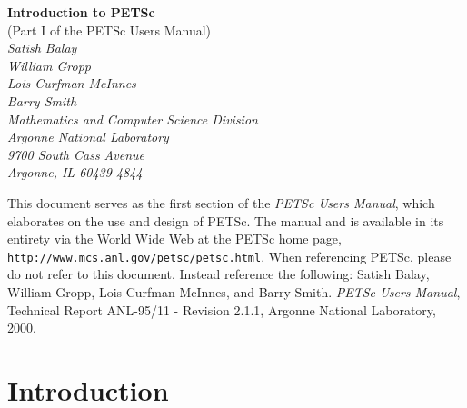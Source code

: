 \documentclass[twoside,12pt]{../sty/report_petsc}
\begin{document}
\begin{center}
$\!$
\vspace{1.0cm}
\thispagestyle{empty}

{\huge \bf Introduction to PETSc}\\ 
\vspace{0.5cm}
{\LARGE (Part I of the PETSc Users Manual)} \\
\vspace{1.5cm}
{\large \em Satish Balay\\William Gropp\\Lois Curfman McInnes\\Barry Smith\\
\medskip \medskip
Mathematics and Computer Science Division\\
Argonne National Laboratory\\
9700 South Cass Avenue\\
Argonne, IL 60439-4844\\
}
\end{center}

\vspace{1.0cm}



 This document serves as the first section of the {\em PETSc Users
Manual}, which elaborates on the use and design of PETSc. The
manual and is available in its entirety via the World Wide Web at
the PETSc home page, {\tt http://www.mcs.anl.gov/petsc/petsc.html}.
When referencing PETSc, please do 
not refer to this document. Instead reference the following: Satish
Balay, William Gropp, Lois Curfman McInnes, and Barry Smith.  {\em
PETSc Users Manual}, Technical Report ANL-95/11 - Revision 2.1.1,
Argonne National Laboratory, 2000.

%
\newpage


\newpage
\section{Introduction}

\end{document}
